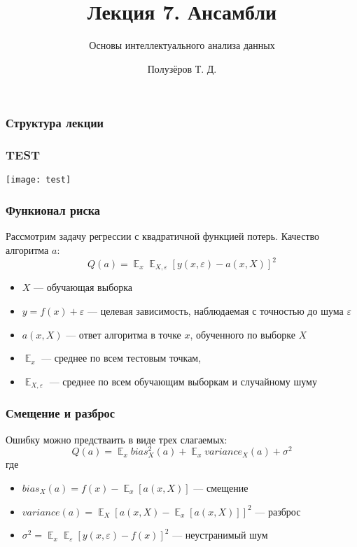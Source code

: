 \documentclass{beamer}
\title[Ансамбли]{Лекция 7. Ансамбли}
\subtitle{Основы интеллектуального анализа данных}
\author{Полузёров Т. Д.}
\institute{БГУ ФПМИ}
\date{}
\newcommand{\eps}{\varepsilon}
\DeclareMathOperator{\E}{\mathbb{E}}
\begin{document}
	
	\begin{frame}
		\titlepage
	\end{frame}
	
	
	\begin{center}
		\frametitle{Структура лекции}
		\tableofcontents
	\end{center}
    
	\begin{frame}
        \frametitle{TEST}
        \texttt{[image: test]}
    \end{frame}

	\begin{frame}
		\frametitle{Функионал риска}
		Рассмотрим задачу регрессии с квадратичной функцией потерь. Качество алгоритма $a$:
		\[
		Q(a) = \E_x \E_{X, \eps} [y(x, \eps) - a(x, X)]^{2}
		\]

		\begin{itemize}
			\item $X$ --- обучающая выборка
			\item $y = f(x) + \eps$ --- целевая зависимость, наблюдаемая с точностью до шума $\eps$
			\item $a(x, X)$ --- ответ алгоритма в точке $x$, обученного по выборке $X$
			\item $\E_x$ --- среднее по всем тестовым точкам, 
			\item $\E_{X, \eps}$ --- среднее по всем обучающим выборкам и случайному шуму
		\end{itemize}
	\end{frame}

	\begin{frame}
		\frametitle{Смещение и разброс}
		
		Ошибку можно предстваить в виде трех слагаемых:
		\[
		Q(a) = \E_x bias_X^2 (a) + 
		\E_x variance_X (a)
		+ \sigma^2
		\]
		где
		\begin{itemize}
			\item $bias_X(a) = f(x) - \E_x [a(x, X)]$ --- смещение
			\item $variance(a) = \E_X [ a(x, X) - \E_x[a(x, X)] ]^2$ --- разброс
			\item $\sigma^2 = \E_x \E_{\eps} [y(x, \eps) - f(x)]^2$ --- неустранимый шум
		\end{itemize}
	\end{frame}
\end{document}
